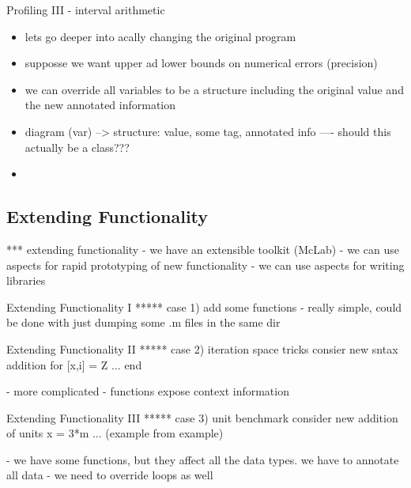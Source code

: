 \begin{frame}{Profiling III - interval arithmetic}
  \begin{itemize}
  \item lets go deeper into acally changing the original program
  \item supposse we want upper ad lower bounds on numerical errors
  (precision)
  \item we can override all variables to be a structure including the
  original value and the new annotated information
  \item diagram (var) --> structure: value, some tag, annotated info
  ---- should this actually be a class???
  \item 
  \end{itemize}
\end{frame}


\subsection{Extending Functionality}

*** extending functionality
    - we have an extensible toolkit (McLab)
    - we can use aspects for rapid prototyping of new functionality
    - we can use aspects for writing libraries

\begin{frame}{Extending Functionality I}
***** case 1)
      add some functions
      - really simple, could be done with just dumping some .m files in the
        same dir
\end{frame}
\begin{frame}{Extending Functionality II}
***** case 2)
      iteration space tricks
      consier new sntax addition
      for [x,i] = Z
      ...
      end

      - more complicated - functions expose context information

\end{frame}
\begin{frame}{Extending Functionality III}
***** case 3)
      unit benchmark
      consider new addition of units
      x = 3*m
      ... (example from example)

      - we have some functions, but they affect all the data types. we have
        to annotate all data
      - we need to override loops as well

\end{frame}


